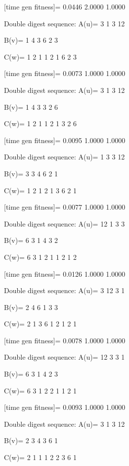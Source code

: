 [time gen fitness]=
    0.0446    2.0000    1.0000

Double digest sequence:
A(u)=
     3     1     3    12

B(v)=
     1     4     3     6     2     3

C(w)=
     1     2     1     1     2     1     6     2     3

[time gen fitness]=
    0.0073    1.0000    1.0000

Double digest sequence:
A(u)=
     3     1     3    12

B(v)=
     1     4     3     3     2     6

C(w)=
     1     2     1     1     2     1     3     2     6

[time gen fitness]=
    0.0095    1.0000    1.0000

Double digest sequence:
A(u)=
     1     3     3    12

B(v)=
     3     3     4     6     2     1

C(w)=
     1     2     1     2     1     3     6     2     1

[time gen fitness]=
    0.0077    1.0000    1.0000

Double digest sequence:
A(u)=
    12     1     3     3

B(v)=
     6     3     1     4     3     2

C(w)=
     6     3     1     2     1     1     2     1     2

[time gen fitness]=
    0.0126    1.0000    1.0000

Double digest sequence:
A(u)=
     3    12     3     1

B(v)=
     2     4     6     1     3     3

C(w)=
     2     1     3     6     1     2     1     2     1

[time gen fitness]=
    0.0078    1.0000    1.0000

Double digest sequence:
A(u)=
    12     3     3     1

B(v)=
     6     3     1     4     2     3

C(w)=
     6     3     1     2     2     1     1     2     1

[time gen fitness]=
    0.0093    1.0000    1.0000

Double digest sequence:
A(u)=
     3     1     3    12

B(v)=
     2     3     4     3     6     1

C(w)=
     2     1     1     1     2     2     3     6     1

